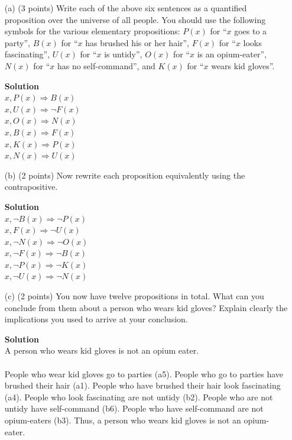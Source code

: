 \documentclass{article}\usepackage{amsmath,amssymb,amsthm,tikz,tkz-graph,color,chngpage,soul,hyperref,csquotes,graphicx,floatrow}\newcommand*{\QEDB}{\hfill\ensuremath{\square}}\newtheorem*{prop}{Proposition}\usepackage[shortlabels]{enumitem}\usepackage[nobreak=true]{mdframed}\usetikzlibrary{matrix,calc}\MakeOuterQuote{"}\usepackage[margin=1in]{geometry} \newtheorem{theorem}{Theorem} \usepackage{circuitikz}
\begin{document}
\begin{enumerate}
\begin{enumerate}
\item[(a)] (3 points) Write each of the above six sentences as a quantified proposition over the universe of all people. You should use the following symbols for the various elementary propositions: $P(x)$ for ``$x$ goes to a party'', $B(x)$ for ``$x$ has brushed his or her hair'', $F(x)$ for ``$x$ looks fascinating'', $U(x)$ for ``$x$ is untidy'', $O(x)$ for ``$x$ is an opium-eater'', $N(x)$ for ``$x$ has no self-command'', and $K(x)$ for ``$x$ wears kid gloves''.
\begin{mdframed} \textbf{Solution} \\
\forall $x, P(x) \Rightarrow B(x)$\\
\forall $x, U(x) \Rightarrow \neg F(x)$\\
\forall $x, O(x) \Rightarrow N(x)$ \\
\forall $x, B(x) \Rightarrow F(x)$\\
\forall $x, K(x) \Rightarrow P(x)$ \\
\forall $x, N(x) \Rightarrow U(x)$ 
\end{mdframed}
\item[(b)] (2 points) Now rewrite each proposition equivalently using the contrapositive.
\begin{mdframed} \textbf{Solution} \\
\forall $x, \neg B(x) \Rightarrow \neg P(x)$\\
\forall $x, F(x) \Rightarrow \neg U(x)$\\
\forall $x, \neg N(x) \Rightarrow \neg O(x)$ \\
\forall $x, \neg F(x) \Rightarrow \neg B(x)$\\
\forall $x, \neg P(x) \Rightarrow \neg K(x)$ \\
\forall $x, \neg U(x) \Rightarrow \neg N(x)$ 
\end{mdframed}
\item[(c)] (2 points) You now have twelve propositions in total. What can you conclude from them about a person who wears kid gloves? Explain clearly the implications you used to arrive at your conclusion.
\begin{mdframed} \textbf{Solution} \\
A person who wears kid gloves is not an opium eater.\\
\\
People who wear kid gloves go to parties (a5). People who go to parties have brushed their hair (a1). People who have brushed their hair look fascinating (a4). People who look fascinating are not untidy (b2). People who are not untidy have self-command (b6). People who have self-command are not opium-eaters (b3). Thus, a person who wears kid gloves is not an opium-eater.
\end{mdframed}
\end{enumerate}


\end{enumerate}
\end{document}
